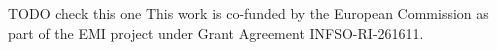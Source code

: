 TODO check this one
This work is co-funded by the European Commission as part of
the EMI project under
Grant Agreement INFSO-RI-261611.
